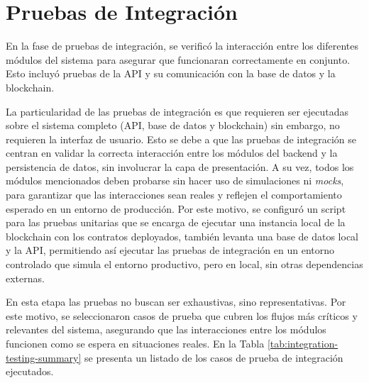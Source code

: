 \section{Pruebas de Integración}
\label{sec:integration-testing-details}

En la fase de pruebas de integración, se verificó la interacción entre los diferentes módulos del sistema para asegurar que funcionaran correctamente en conjunto. Esto incluyó pruebas de la API y su comunicación con la base de datos y la blockchain. 

La particularidad de las pruebas de integración es que requieren ser ejecutadas sobre el sistema completo (API, base de datos y blockchain) sin embargo, no requieren la interfaz de usuario. Esto se debe a que las pruebas de integración se centran en validar la correcta interacción entre los módulos del backend y la persistencia de datos, sin involucrar la capa de presentación. A su vez, todos los módulos mencionados deben probarse sin hacer uso de simulaciones ni \textit{mocks}, para garantizar que las interacciones sean reales y reflejen el comportamiento esperado en un entorno de producción. Por este motivo, se configuró un script para las pruebas unitarias que se encarga de ejecutar una instancia local de la blockchain con los contratos deployados, también levanta una base de datos local y la API, permitiendo así ejecutar las pruebas de integración en un entorno controlado que simula el entorno productivo, pero en local, sin otras dependencias externas. 

En esta etapa las pruebas no buscan ser exhaustivas, sino representativas. Por este motivo, se seleccionaron casos de prueba que cubren los flujos más críticos y relevantes del sistema, asegurando que las interacciones entre los módulos funcionen como se espera en situaciones reales. En la Tabla \ref{tab:integration-testing-summary} se presenta un listado de los casos de prueba de integración ejecutados.

